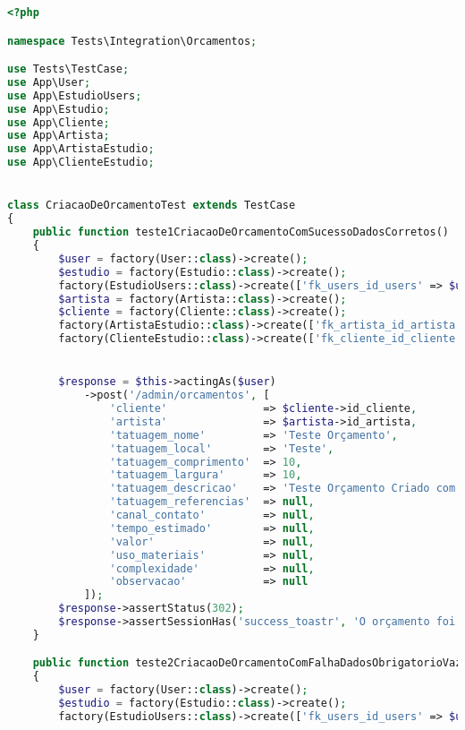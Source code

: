 \begin{lstlisting}[language=PHP, caption= Scripts de teste de Criação de Orçamentos, nolol,
label={code:CriacaoDeOrcamentoTest}]
<?php

namespace Tests\Integration\Orcamentos;

use Tests\TestCase;
use App\User;
use App\EstudioUsers;
use App\Estudio;
use App\Cliente;
use App\Artista;
use App\ArtistaEstudio;
use App\ClienteEstudio;


class CriacaoDeOrcamentoTest extends TestCase
{
    public function teste1CriacaoDeOrcamentoComSucessoDadosCorretos()
    {
        $user = factory(User::class)->create();
        $estudio = factory(Estudio::class)->create();
        factory(EstudioUsers::class)->create(['fk_users_id_users' => $user->id, 'fk_estudio_id_estudio' => $estudio->id_estudio]);
        $artista = factory(Artista::class)->create();
        $cliente = factory(Cliente::class)->create();
        factory(ArtistaEstudio::class)->create(['fk_artista_id_artista' => $artista->id_artista, 'fk_estudio_id_estudio' => $estudio->id_estudio]);
        factory(ClienteEstudio::class)->create(['fk_cliente_id_cliente' => $cliente->id_cliente, 'fk_estudio_id_estudio' => $estudio->id_estudio]);


        $response = $this->actingAs($user)
            ->post('/admin/orcamentos', [
                'cliente'               => $cliente->id_cliente,
                'artista'               => $artista->id_artista,
                'tatuagem_nome'         => 'Teste Orçamento',
                'tatuagem_local'        => 'Teste',
                'tatuagem_comprimento'  => 10,
                'tatuagem_largura'      => 10,
                'tatuagem_descricao'    => 'Teste Orçamento Criado com Sucesso!',
                'tatuagem_referencias'  => null,
                'canal_contato'         => null,
                'tempo_estimado'        => null,
                'valor'                 => null,
                'uso_materiais'         => null,
                'complexidade'          => null,
                'observacao'            => null
            ]);
        $response->assertStatus(302);
        $response->assertSessionHas('success_toastr', 'O orçamento foi cadastrado com sucesso!');
    }

    public function teste2CriacaoDeOrcamentoComFalhaDadosObrigatorioVazios()
    {
        $user = factory(User::class)->create();
        $estudio = factory(Estudio::class)->create();
        factory(EstudioUsers::class)->create(['fk_users_id_users' => $user->id, 'fk_estudio_id_estudio' => $estudio->id_estudio]);


\end{lstlisting}
